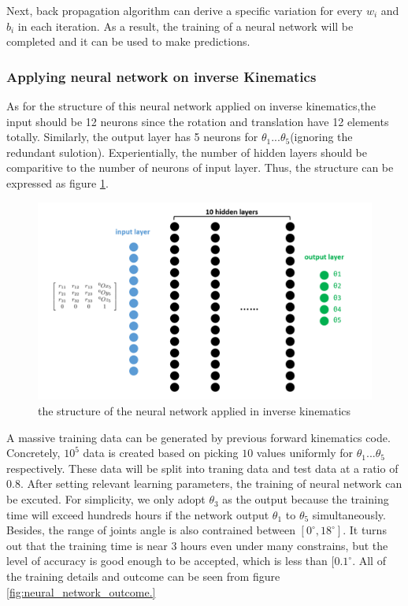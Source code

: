 Next, back propagation algorithm can derive a specific variation for every $w_i$ and $b_i$ in each iteration. As a result, the training of a neural network will be completed and it can be used to make predictions.  

\subsubsection{Applying neural network on inverse Kinematics}
As for the structure of this neural network applied on inverse kinematics,the input should be 12 neurons since the rotation and translation have 12 elements totally. Similarly, the output layer has 5 neurons for $\theta_1...\theta_5$(ignoring the redundant sulotion). Experientially, the number of hidden layers should be comparitive to the number of neurons of input layer. Thus, the structure can be expressed as figure \ref{fig:IK_neural_network}. 

\begin{figure}[htbp] 
\begin{center}
\includegraphics[width=\textwidth]{images/IK_neural_network}
\caption{the structure of the neural network applied in inverse kinematics}
\label{fig:IK_neural_network}
\end{center}
\end{figure}

A massive training data can be generated by previous forward kinematics code. Concretely, $10^5$ data is created based on picking $10$ values uniformly for $\theta_1...\theta_5$ respectively. These data will be split into traning data and test data at a ratio of $0.8$.
After setting relevant learning parameters, the training of neural network can be excuted. For simplicity, we only adopt $\theta_3$ as the output because the training time will exceed hundreds hours if the network output $\theta_1$ to $\theta_5$ simultaneously. Besides, the range of joints angle is also contrained between $[0^{\circ},18^{\circ}]$. 
It turns out that the training time is near 3 hours even under many constrains, but the level of accuracy is good enough to be accepted, which is less than $[0.1^{\circ}$. All of the training details and outcome can be seen from figure \ref{fig:neural_network_outcome.}

